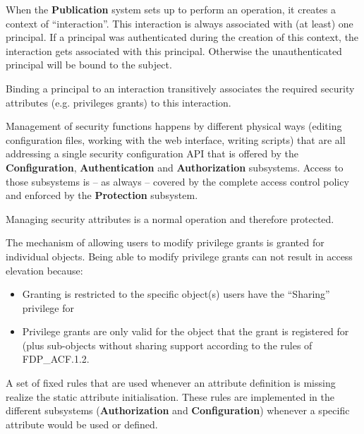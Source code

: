 \documentclass[12pt,english]{scrbook}
\begin{document}

When the \textbf{Publication} system sets up to perform an operation, it
creates a context of ``interaction''. This interaction is always associated
with (at least) one principal. If a principal was authenticated during the
creation of this context, the interaction gets associated with this principal.
Otherwise the unauthenticated principal will be bound to the subject.

Binding a principal to an interaction transitively associates the required security
attributes (e.g. privileges grants) to this interaction.


Management of security functions happens by different physical ways (editing
configuration files, working with the web interface, writing scripts) that are
all addressing a single security configuration API that is offered by the
\textbf{Configuration}, \textbf{Authentication} and \textbf{Authorization}
subsystems. Access to those subsystems is -- as always -- covered by the
complete access control policy and enforced by the \textbf{Protection}
subsystem.


Managing security attributes is a normal operation and therefore protected.

The mechanism of allowing users to modify privilege grants is granted for
individual objects. Being able to modify privilege grants can not result in
access elevation because:

\begin{itemize}
    \item Granting is restricted to the specific object(s) users have
the ``Sharing'' privilege for
    \item Privilege grants are only valid for the object that the grant is
        registered for (plus sub-objects without sharing support according to
        the rules of FDP\_ACF.1.2.
\end{itemize}


A set of fixed rules that are used whenever an attribute definition is missing
realize the static attribute initialisation. These rules are implemented in the
different subsystems (\textbf{Authorization} and \textbf{Configuration})
whenever a specific attribute would be used or defined.
\end{document}
